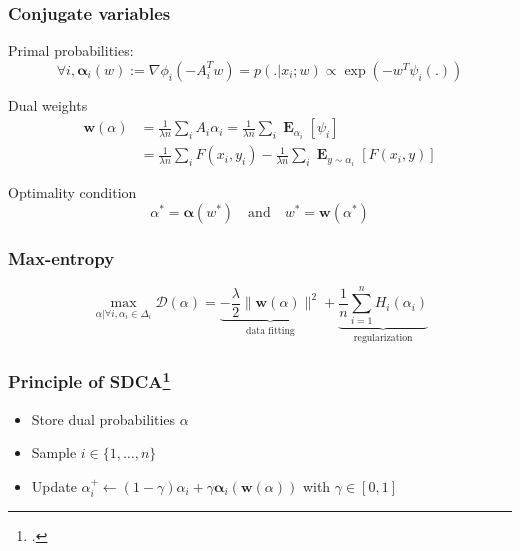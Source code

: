 \documentclass{beamer}
\DeclareMathOperator{\1}{\mathbb{1}}
\DeclareMathOperator{\E}{\mathbf{E}}
\begin{document}
\begin{frame}
\frametitle{Conjugate variables}

Primal probabilities:
\begin{equation*}
	\label{primal to dual}
	\forall i, \bm \alpha_i(w) := \nabla\phi_i(-A_i^Tw) = p(.|x_i; w) \propto \exp(-w^T \psi_i(.))
\end{equation*}

Dual weights
\begin{align*}
	\label{dual to primal}
	\bm w(\alpha) 
	& =   \frac{1}{\lambda n} \sum_i A_i \alpha_i = \frac{1}{\lambda n} \sum_i \E_{\alpha_i} [\psi_i] \\
	& =\frac{1}{\lambda n} \sum_i F(x_i, y_i) - \frac{1}{\lambda n} \sum_i \E_{y \sim \alpha_i} [F(x_i, y)]
\end{align*}

\begin{block}{Optimality condition}
	\begin{equation*}
		\alpha^* = \bm \alpha(w^*) \quad \textrm{and} \quad w^* = \bm w(\alpha^*)
	\end{equation*}
\end{block}

\end{frame}
\begin{frame}
	\frametitle{Max-entropy}
	
\begin{equation*}
	\max_{\alpha | \forall i, \alpha_i \in \Delta_i} \mathscr{D}(\alpha) = \underbrace{-\frac{\lambda}{2} \| \bm w(\alpha) \|^2}_\text{data fitting} + \underbrace{ \frac{1}{n} \sum_{i=1}^n H_i(\alpha_i)}_\text{regularization}
\end{equation*}
	
\end{frame}
\begin{frame}
\frametitle{Principle of SDCA\footcite{shalev-shwartz_accelerated_2013-1}}
\begin{itemize}
	\item Store dual probabilities $\alpha$
	\item Sample $i \in \{1,\dots ,n\}$
	\item Update $\alpha_i^+ \leftarrow (1-\gamma) \alpha_i + \gamma \bm \alpha_i(\bm w(\alpha))$ with $\gamma \in [0, 1]$
\end{itemize}

\end{frame}
\end{document}
